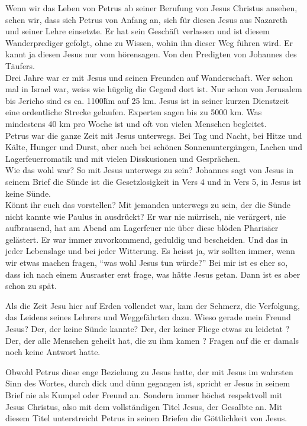 \documentclass[fontsize=16pt]{mybib}
\begin{document}
Wenn wir das Leben von Petrus ab seiner Berufung von Jesus Christus ansehen, sehen wir, dass sich Petrus von Anfang an, sich für diesen Jesus aus Nazareth und seiner Lehre einsetzte. Er hat sein Geschäft verlassen und ist diesem Wanderprediger gefolgt, ohne zu Wissen, wohin ihn dieser Weg führen wird. Er kannt ja diesen Jesus nur vom hörensagen. Von den Predigten von Johannes des Täufers.\\
Drei Jahre war er mit Jesus und seinen Freunden auf Wanderschaft. Wer schon mal in Israel war, weiss wie hügelig die Gegend dort ist. Nur schon von Jerusalem bis Jericho sind es ca. 1100\~hm auf 25 km. Jesus ist in seiner kurzen Dienstzeit eine ordentliche Strecke gelaufen. Experten sagen bis zu 5000 km. Was mindestens 40 km pro Woche ist und oft von vielen Menschen begleitet.\\
Petrus war die ganze Zeit mit Jesus unterwegs. Bei Tag und Nacht, bei Hitze und Kälte, Hunger und Durst, aber auch bei schönen Sonnenuntergängen, Lachen und Lagerfeuerromatik und mit vielen Disskusionen und Gesprächen. \\
Wie das wohl war? So mit Jesus unterwegs zu sein? Johannes sagt von Jesus in seinem Brief  die Sünde ist die Gesetzlosigkeit in Vers 4 und in Vers 5, in Jesus ist keine Sünde.\\
Könnt ihr euch das vorstellen? Mit jemanden unterwegs zu sein, der die Sünde nicht kannte wie Paulus in  ausdrückt? Er war nie mürrisch, nie verärgert, nie aufbrausend, hat am Abend am Lagerfeuer nie über diese blöden Pharisäer gelästert. Er war immer zuvorkommend, geduldig und bescheiden. Und das in jeder Lebenslage und bei jeder Witterung. Es heisst ja, wir sollten immer, wenn wir etwas machen fragen, \enquote{was wohl Jesus tun würde?} Bei mir ist es eher so, dass ich nach einem Ausraster erst frage, was hätte Jesus getan. Dann ist es aber schon zu spät.

Als die Zeit Jesu hier auf Erden vollendet war, kam der Schmerz, die Verfolgung, das Leidens seines Lehrers und Weggefährten dazu. Wieso gerade mein Freund Jesus?  Der, der keine Sünde kannte? Der, der keiner Fliege etwas zu leidetat ? Der, der alle Menschen geheilt hat, die zu ihm kamen ? Fragen auf die er damals noch keine Antwort hatte.

Obwohl Petrus diese enge Beziehung zu Jesus hatte, der mit Jesus im wahrsten Sinn des Wortes, durch dick und dünn gegangen ist, spricht er Jesus in seinem Brief nie als Kumpel oder Freund an. Sondern immer höchst respektvoll mit Jesus Christus, also mit dem vollständigen Titel Jesus, der Gesalbte an. Mit diesem Titel unterstreicht Petrus in seinen Briefen die Göttlichkeit von Jesus.
\end{document}
